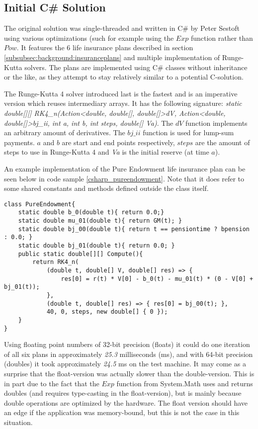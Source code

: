 \subsection{Initial C\# Solution}
The original solution was single-threaded and written in C\# by Peter Sestoft using various optimizations (such for example using the $Exp$ function rather than $Pow$.
It features the 6 life insurance plans described in section \ref{subsubsec:background:insuranceplans} and multiple implementation of Runge-Kutta solvers.
The plans are implemented using C\# classes without inheritance or the like, as they attempt to stay relatively similar to a potential C-solution.

The Runge-Kutta 4 solver introduced last is the fastest and is an imperative version which reuses intermediary arrays.
It has the following signature: \textit{static double[][] RK4\_n(Action\textless double, double[], double[]\textgreater  dV, Action\textless double, double[]\textgreater  bj\_ii, int a, int b, int steps, double[] Va)}.
The $dV$ function implements an arbitrary amount of derivatives.
The $bj\_ii$ function is used for lump-sum payments.
$a$ and $b$ are start and end points respectively, $steps$ are the amount of steps to use in Runge-Kutta 4 and \textit{Va} is the initial reserve (at time $a$).

An example implementation of the Pure Endowment life insurance plan can be seen below in code sample \ref{csharp_pureendowment}. 
Note that it does refer to some shared constants and methods defined outside the class itself.

\begin{lstlisting}[language=CSharp, caption=The pure endowment insurance plan expressed in C\#, label=csharp_pureendowment]
class PureEndowment{
    static double b_0(double t){ return 0.0;}
    static double mu_01(double t){ return GM(t); }
    static double bj_00(double t){ return t == pensiontime ? bpension : 0.0; }
    static double bj_01(double t){ return 0.0; }
    public static double[][] Compute(){
        return RK4_n(
            (double t, double[] V, double[] res) => { 
                res[0] = r(t) * V[0] - b_0(t) - mu_01(t) * (0 - V[0] + bj_01(t)); 
            },
            (double t, double[] res) => { res[0] = bj_00(t); },
            40, 0, steps, new double[] { 0 });
    }
}
\end{lstlisting}

Using floating point numbers of 32-bit precision (floats) it could do one iteration of all six plans in approximately \emph{25.3} milliseconds (ms), and with 64-bit precision (doubles) it took approximately \emph{24.5} ms on the test machine.
It may come as a surprise that the float-version was actually slower than the double-version.
This is in part due to the fact that the $Exp$ function from System.Math uses and returns doubles (and requires type-casting in the float-version), but is mainly because double operations are optimized by the hardware\cite{northrup2008mcts}.
The float version should have an edge if the application was memory-bound, but this is not the case in this situation.